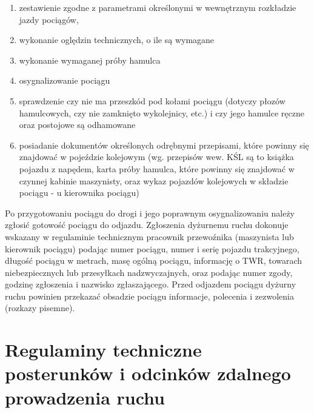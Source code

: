 \begin{enumerate}
\item zestawienie zgodne z parametrami określonymi w wewnętrznym rozkładzie jazdy pociągów,
\item wykonanie oględzin technicznych, o ile są wymagane
\item wykonanie wymaganej próby hamulca
\item osygnalizowanie pociągu
\item sprawdzenie czy nie ma przeszkód pod kołami pociągu (dotyczy płozów hamulcowych, czy nie zamknięto wykolejnicy,
etc.) i czy jego hamulce ręczne oraz postojowe są odhamowane
\item posiadanie dokumentów określonych odrębnymi przepisami, które powinny się znajdować w pojeździe kolejowym (wg. przepisów wew. KŚL są to książka pojazdu z napędem, karta próby hamulca, które powinny się znajdować w czynnej kabinie maszynisty, oraz wykaz pojazdów kolejowych w składzie pociągu - u kierownika pociągu)
\end{enumerate}
Po przygotowaniu pociągu do drogi i jego poprawnym osygnalizowaniu należy zgłosić gotowość pociągu do odjazdu. Zgłoszenia dyżurnemu ruchu dokonuje wskazany w regulaminie technicznym pracownik przewoźnika (maszynista lub kierownik pociągu) podając numer pociągu, numer i serię pojazdu trakcyjnego, długość pociągu w metrach, masę ogólną pociągu, informację o TWR, towarach niebezpiecznych lub przesyłkach nadzwyczajnych, oraz podając numer zgody, godzinę zgłoszenia i nazwisko zgłaszającego. Przed odjazdem pociągu dyżurny ruchu powinien przekazać obsadzie pociągu informacje, polecenia i zezwolenia (rozkazy pisemne).

\chapter{Regulaminy techniczne posterunków i odcinków zdalnego prowadzenia ruchu}

